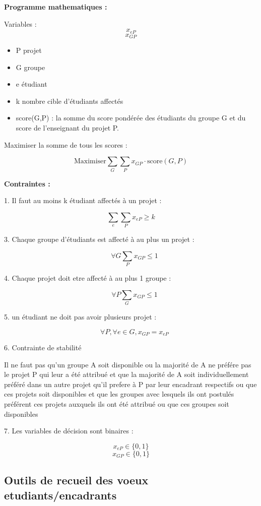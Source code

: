 \documentclass{article}
\begin{document}
\textbf{Programme mathematiques :}

Variables : \[ x_{eP} \] 
\[ x_{GP} \]
\begin{itemize}
\item P projet
\item G groupe
\item e étudiant
\item k nombre cible d'étudiants affectés
\item score(G,P) : la somme du score pondérée des étudiants du groupe G et du score de l'enseignant du projet P.  
\end{itemize}

Maximiser la somme de tous les scores :

\[ \text{Maximiser} \sum_{G} \sum_{P} x_{GP} \cdot \text{score}(G, P) \]

\textbf{Contraintes :}

1. Il faut au moins k étudiant affectés à un projet : 

\[ \sum_{e} \sum_{P} x_{eP} \geq k \]

3. Chaque groupe d'étudiants est affecté à au plus un projet :

\[ \quad \forall G \sum_{P} x_{GP} \leq 1 \]

4. Chaque projet doit etre affecté à au plus 1 groupe : 

\[\quad \forall P \sum_{G} x_{GP} \leq 1 \]

5. un étudiant ne doit pas avoir plusieurs projet : 

\[\quad \forall P, \forall e \in G, x_{GP} = x_{eP} \]

6. Contrainte de stabilité 

\vspace{1em}

Il ne faut pas qu'un groupe A soit disponible ou la majorité de A ne préfére pas le projet P qui leur 
a été attribué et que la majorité de A soit individuellement préféré dans un autre projet qu'il 
prefere à P par leur encadrant respectifs ou que ces projets soit disponibles et que les groupes avec 
lesquels ils ont postulés préférent ces projets auxquels ils ont été attribué ou que ces groupes soit 
disponibles

\vspace{1em}

7. Les variables de décision sont binaires :

\[ x_{eP} \in \{0, 1\} \]
\[ x_{GP} \in \{0, 1\} \]

\subsection{Outils de recueil des voeux etudiants/encadrants}
\end{document}
